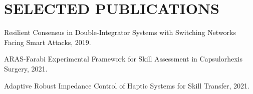 \documentclass[11pt,a4paper,sans]{moderncv} %
\begin{document}
    

  
	\section{SELECTED PUBLICATIONS}
    \href{https://ieeexplore.ieee.org/abstract/document/9071915/}{\textcolor{gray}{\faCloudDownload} }Resilient Consensus in Double-Integrator Systems with Switching Networks Facing Smart Attacks, 2019.
	
    \href{https://ieeexplore.ieee.org/abstract/document/9663494/}{\textcolor{gray}{\faCloudDownload} }ARAS-Farabi Experimental Framework for Skill Assessment in Capsulorhexis Surgery, 2021.
    
    \href{https://ieeexplore.ieee.org/abstract/document/9663486/}{\textcolor{gray}{\faCloudDownload} }Adaptive Robust Impedance Control of Haptic Systems for Skill Transfer, 2021.	
    
\end{document}
